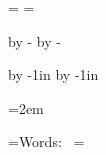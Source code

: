 






\headline={}
\footline={}


\hsize=210mm
\vsize=297mm


\advance\voffset by -\voffset
\advance\hoffset by -\hoffset

\advance\voffset by -1in
\advance\hoffset by -1in


\newskip\titleskip
\titleskip=8pt

\newskip\sourceskip
\sourceskip=8pt

\newskip\posttitleskip
\posttitleskip=0pt

\newskip\basichskip
\basichskip=2em

\newskip\copyrightskip
\copyrightskip=6pt

\newskip\composerskip
\composerskip=4pt

\newdimen\wmdimen
{}=\hbox{{\large Words:  }}
\wmdimen=



\newif\ifalltex
\alltexfalse

